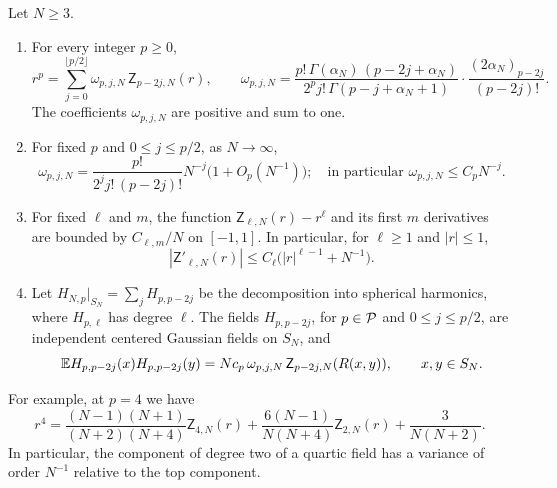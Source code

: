 \begin{lemma}\label{lem:ent-harmonic}
Let $N\ge3$.
\begin{enumerate}
\item For every integer $p\ge0$,
\begin{equation}\label{eq:ent-harmonic}
 r^p=\sum_{j=0}^{\lfloor p/2\rfloor}\omega_{p,j,N}\,
     \mathsf Z_{p-2j,N}(r),\qquad
 \omega_{p,j,N}=\frac{p!\,\Gamma(\alpha_N)\,(p-2j+\alpha_N)}
   {2^pj!\,\Gamma(p-j+\alpha_N+1)}\cdot
   \frac{(2\alpha_N)_{p-2j}}{(p-2j)!}.
\end{equation}
The coefficients $\omega_{p,j,N}$ are positive and sum to one.
\item For fixed $p$ and $0\le j\le p/2$, as $N\to\infty$,
\begin{equation}\label{eq:ent-harmonic-asymp}
 \omega_{p,j,N}=\frac{p!}{2^jj!\,(p-2j)!}N^{-j}\bigl(1+O_p(N^{-1})\bigr);
 \quad\text{in particular } \omega_{p,j,N}\le C_pN^{-j}.
\end{equation}
\item For fixed $\ell$ and $m$, the function $\mathsf Z_{\ell,N}(r)-r^\ell$
and its first $m$ derivatives are bounded by $C_{\ell,m}/N$ on $[-1,1]$. In
particular, for $\ell\ge1$ and $|r|\le1$,
\begin{equation}\label{eq:ent-zonal-derivative}
 |\mathsf Z'_{\ell,N}(r)|\le C_\ell\bigl(|r|^{\ell-1}+N^{-1}\bigr).
\end{equation}
\item Let $H_{N,p}|_{S_N}=\sum_{j}H_{p,p-2j}$ be the decomposition into
spherical harmonics, where $H_{p,\ell}$ has degree $\ell$. The fields
$H_{p,p-2j}$, for $p\in\mathcal P$ and $0\le j\le p/2$, are independent centered
Gaussian fields on $S_N$, and
\begin{equation}\label{eq:ent-sector-cov}
 \mathbb E H_{p,p-2j}(x)H_{p,p-2j}(y)=Nc_p\,\omega_{p,j,N}\,
 \mathsf Z_{p-2j,N}(R(x,y)),\qquad x,y\in S_N.
\end{equation}
\end{enumerate}
\end{lemma}

For example, at $p=4$ we have
\[
 r^4=\frac{(N-1)(N+1)}{(N+2)(N+4)}\mathsf Z_{4,N}(r)
     +\frac{6(N-1)}{N(N+4)}\mathsf Z_{2,N}(r)+\frac{3}{N(N+2)}.
\]
In particular, the component of degree two of a quartic field has a
variance of order $N^{-1}$ relative to the top component.


